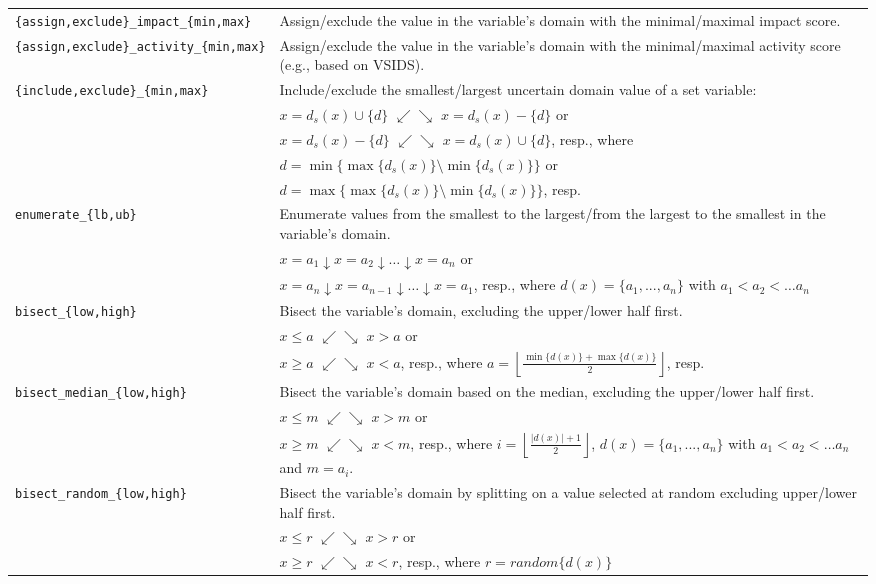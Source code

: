 \documentclass[a4paper]{article}
\newcommand{\fz}[1]{\texttt{#1}}
\begin{document}
\begin{tabular}{p{.35\linewidth}p{.6\linewidth}}
\fz{\{assign,exclude\}\_impact\_\{min,max\}}
& Assign/exclude the value in the variable's domain with the minimal/maximal impact score.\\

\fz{\{assign,exclude\}\_activity\_\{min,max\}}
& Assign/exclude the value in the variable's domain with the minimal/maximal activity score (e.g., based on VSIDS).\\

\fz{\{include,exclude\}\_\{min,max\}}
& Include/exclude the smallest/largest uncertain domain value of a set variable:\\
& $x = d_s(x) \cup \{d\}$ $\swarrow\searrow$ $x= d_s(x)-\{d\}$  or\\  
& $x = d_s(x) -\{d\}$ $\swarrow\searrow$ $x = d_s(x) \cup \{d\}$, resp., where \\
& $d=\min\{\max\{d_s(x)\} \setminus \min\{d_s(x)\} \}$ or \\
& $d=\max\{\max\{d_s(x)\} \setminus \min\{d_s(x)\} \}$, resp.\\

\fz{enumerate\_\{lb,ub\}}
& Enumerate values from the smallest to the largest/from the largest to
  the smallest in the variable's domain.\\
& $x=a_1\downarrow x=a_2 \downarrow \ldots \downarrow x=a_n$ or\\
& $x=a_n\downarrow x=a_{n-1} \downarrow \ldots \downarrow x=a_1$, resp.,
where \mbox{$d(x)=\{a_1,...,a_n\}$} with $a_1 < a_2 < \ldots a_n$ \\

\fz{bisect\_\{low,high\}}
& Bisect the variable's domain, excluding the upper/lower half first.\\
& $x \leq a $ $\swarrow\searrow$ $ x>a$ or\\
& $x \geq  a $ $\swarrow\searrow$ $ x<a$, resp.,
where $a=\left\lfloor\frac{\min\{d(x)\} + \max\{d(x)\}}{2}\right\rfloor$, resp.\\

\fz{bisect\_median\_\{low,high\}}
& Bisect the variable's domain based on the median, excluding the upper/lower half first.\\
& $x \leq m $ $\swarrow\searrow$ $ x>m$ or\\
& $x \geq m $ $\swarrow\searrow$ $ x<m$, resp.,
where $i=\left\lfloor\frac{|d(x)| + 1}{2}\right\rfloor$, \mbox{$d(x)=\{a_1,...,a_n\}$} with $a_1 < a_2 < \ldots a_n$ and $m=a_i$.\\

\fz{bisect\_random\_\{low,high\}}
& Bisect the variable's domain by splitting on a value selected at random excluding upper/lower half first.\\
& $x \leq r $ $\swarrow\searrow$ $ x>r$ or\\
& $x \geq r $ $\swarrow\searrow$ $ x<r$, resp., where $r=random\{d(x)\}$\\


\end{tabular}
\end{document}
